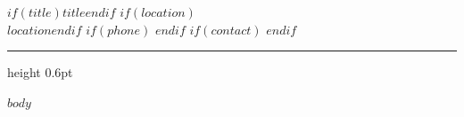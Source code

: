\documentclass[$if(fontsize)$$fontsize$$else$9pt$endif$]{extarticle}
\begin{document}
\begin{center}
  {\fontsize{16}{19}\selectfont\lightfont $if(title)$$title$$endif$}%
  $if(location)$\\[0.15em]{\small $location$}$endif$%
  $if(phone)$ \enspace{\small\color{secondary}\textperiodcentered}$endif$%
  $if(contact)$ \enspace{\small\color{secondary}\textperiodcentered}$endif$
\end{center}

\vspace{0.1em}
{\color{rulecolor}\hrule height 0.6pt}
\vspace{0.2em}

$body$
\end{document}
